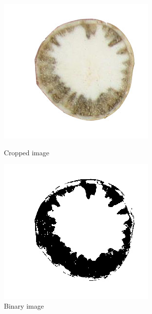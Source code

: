 \documentclass[conference]{IEEEtran}
\begin{document}
\begin{figure}[t!]
\centering
\begin{minipage}[b]{0.3\linewidth}
\includegraphics[width=\textwidth]{images/cropped.jpg}
\caption{Cropped image}
\label{fig:figure4}
\end{minipage}
\hspace{0.5cm}
\begin{minipage}[b]{0.3\linewidth}
\includegraphics[width=\textwidth]{images/croppedbinary.jpg}
\caption{Binary image}
\label{fig:figure5}
\end{minipage}
\end{figure}
\end{document}
